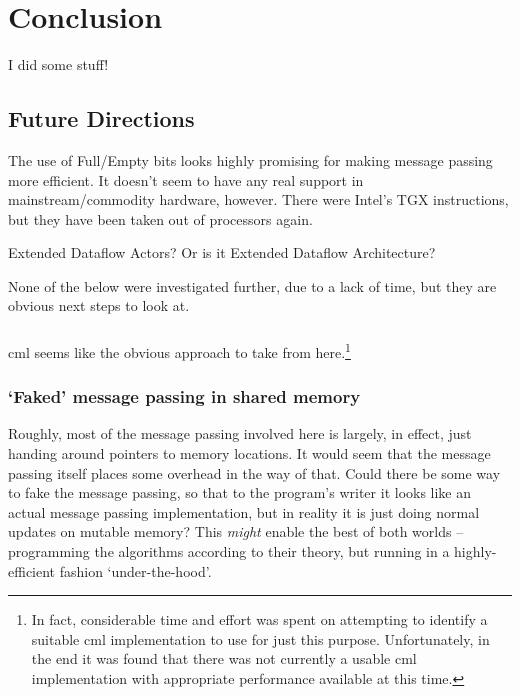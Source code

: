 \chapter{Conclusion}

I did some stuff!

\section{Future Directions}
The use of Full/Empty bits looks highly promising for making message passing more efficient.  It doesn't seem to have any real support in mainstream/commodity hardware, however.  There were Intel's TGX instructions, but they have been taken out of processors again.

Extended Dataflow Actors?  Or is it Extended Dataflow Architecture?






None of the below were investigated further, due to a lack of time, but they are obvious next steps to look at.

\subsection{}
\Gls{cml} seems like the obvious approach to take from here.\footnote{In fact, considerable time and effort was spent on attempting to identify a suitable \gls{cml} implementation to use for just this purpose.  Unfortunately, in the end it was found that there was not currently a usable \gls{cml} implementation with appropriate performance available at this time.}

\subsection{`Faked' message passing in shared memory}
Roughly, most of the message passing involved here is largely, in effect, just handing around pointers to memory locations.  It would seem that the message passing itself places some overhead in the way of that.  Could there be some way to fake the message passing, so that to the program's writer it looks like an actual message passing implementation, but in reality it is just doing normal updates on mutable memory?  This \emph{might} enable the best of both worlds -- programming the algorithms according to their theory, but running in a highly-efficient fashion `under-the-hood'.

